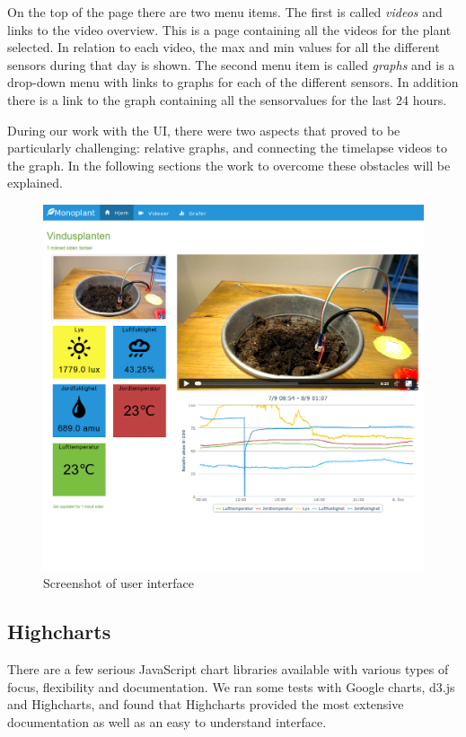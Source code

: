 On the top of the page there are two menu items. The first  is called \emph{videos} and links to the video overview. This is a page containing all the videos for the plant selected. In relation to each video, the max and min values for all the different sensors during that day is shown. The second menu item is called \emph{graphs} and is a drop-down menu with links to graphs for each of the different sensors. In addition there is a link to the graph containing all the sensorvalues for the last 24 hours. 

During our work with the UI, there were two aspects that proved to be particularly challenging: relative graphs, and connecting the timelapse videos to the graph. In the following sections the work to overcome these obstacles will be explained. 

\begin{figure}
\centering
\includegraphics[width=1\textwidth]{img/interface/mainpage.png}
\caption{Screenshot of user interface}
\label{fig:mainpage}
\end{figure}

\subsection{Highcharts}
There are a few serious JavaScript chart libraries available with various types of focus, flexibility and documentation. We ran some tests with Google charts, d3.js and Highcharts, and found that Highcharts provided the most extensive documentation as well as an easy to understand interface. 

